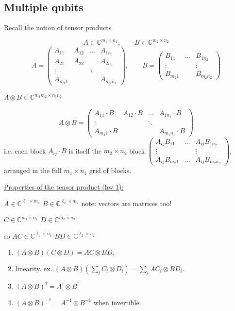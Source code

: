 \documentclass[11pt]{article}
\begin{document}
\subsection*{Multiple qubits}

Recall the notion of tensor products

\[
A \in \mathbb{C}^{m_1 \times n_1}, \qquad B \in \mathbb{C}^{m_2 \times n_2}
\]
\[
A = \begin{pmatrix} A_{11} & A_{12} & \dots & A_{1n_1} \\ A_{21} & A_{22} & & A_{2n_1} \\ \vdots & & \ddots & \\ A_{m_1 1} & & & A_{m_1 n_1} \end{pmatrix}, \qquad
B = \begin{pmatrix} B_{11} & \dots & B_{1n_2} \\ \vdots & & \vdots \\ B_{m_2 1} & & B_{m_2 n_2} \end{pmatrix}
\]

$A \otimes B \in \mathbb{C}^{m_1 m_2 \times n_1 n_2}$

\[
A \otimes B = \begin{pmatrix} A_{11}\cdot B & A_{12}\cdot B & \dots & A_{1n_1}\cdot B \\ \vdots & & \ddots & \\ A_{m_1 1}\cdot B & & & A_{m_1 n_1}\cdot B \end{pmatrix}
\]
i.e. each block $A_{ij}\cdot B$ is itself the $m_2 \times n_2$ block $\begin{pmatrix} A_{ij}B_{11} & \dots & A_{ij}B_{1n_2} \\ \vdots & & \vdots \\ A_{ij}B_{m_2 1} & \dots & A_{ij}B_{m_2 n_2} \end{pmatrix}$, arranged in the full $m_1\times n_1$ grid of blocks.

\underline{Properties of the tensor product (hw 1):}

$A \in \mathbb{C}^{\ell_1\times m_1}$ \quad $B \in \mathbb{C}^{\ell_2\times m_2}$ \hfill note: vectors are matrices too!

$C \in \mathbb{C}^{m_1\times n_1}$ \quad $D \in \mathbb{C}^{m_2\times n_2}$

so $AC \in \mathbb{C}^{\ell_1\times n_1}$ \quad $BD \in \mathbb{C}^{\ell_2\times n_2}$

\begin{enumerate}
    \item[\textcircled{1}] $(A\otimes B)(C\otimes D) = AC \otimes BD$.
    \item[\textcircled{2}] linearity. ex. $(A\otimes B)\left(\sum_i C_i \otimes D_i\right) = \sum_i AC_i \otimes BD_i$.
    \item[\textcircled{2}] $(A\otimes B)^\dagger = A^\dagger \otimes B^\dagger$
    \item[\textcircled{3}] $(A\otimes B)^{-1} = A^{-1}\otimes B^{-1}$ when invertible.
\end{enumerate}
\end{document}
